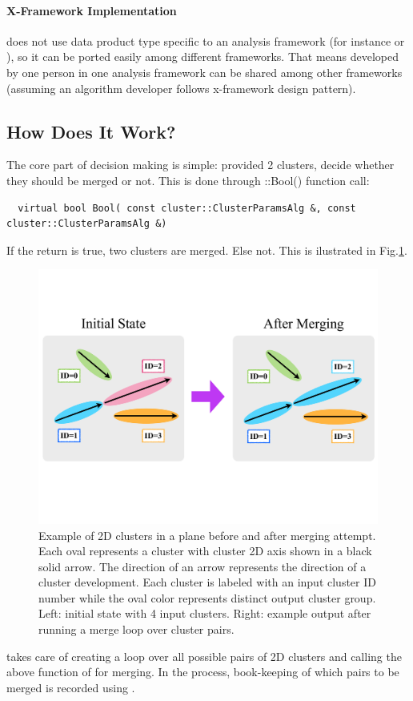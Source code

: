 \paragraph{X-Framework Implementation}
{\cmerge} does not use data product type specific to an analysis framework (for instance {\larlight} or {\larsoft}), so it can be ported easily among different frameworks. That means {\cmalgo} developed by one person in one analysis framework can be shared among other frameworks (assuming an algorithm developer follows x-framework design pattern).\\

\subsection{How Does It Work?}
\label{sec:fmwk:cmerge:how}
The core part of decision making is simple: provided 2 clusters, decide whether they should be merged or not.
This is done through {\cmalgo::Bool()} function call:
\begin{lstlisting}
  virtual bool Bool( const cluster::ClusterParamsAlg &, const cluster::ClusterParamsAlg &)
\end{lstlisting}
If the return is {\ttfamily true}, two clusters are merged. Else not.
This is ilustrated in Fig.\ref{sec:fmwk:cmerge:merge_example}.

\begin{figure}[ht]\begin{center}
\includegraphics[width=13cm]{./src/Pictures/MergeExample.pdf}
\caption{Example of 2D clusters in a plane before and after merging attempt. Each oval represents a cluster with cluster 2D axis shown in a black solid arrow. The direction of an arrow represents the direction of a cluster development. Each cluster is labeled with an input cluster ID number while the oval color represents distinct output cluster group. Left: initial state with 4 input clusters. Right: example output after running a merge loop over cluster pairs. }
\label{sec:fmwk:cmerge:merge_example}
\end{center}\end{figure}
{\cmerge} takes care of creating a loop over all possible pairs of 2D clusters and calling the above function of {\cmalgo} for merging.
In the process, book-keeping of which pairs to be merged is recorded using {\cbkeeper}.

